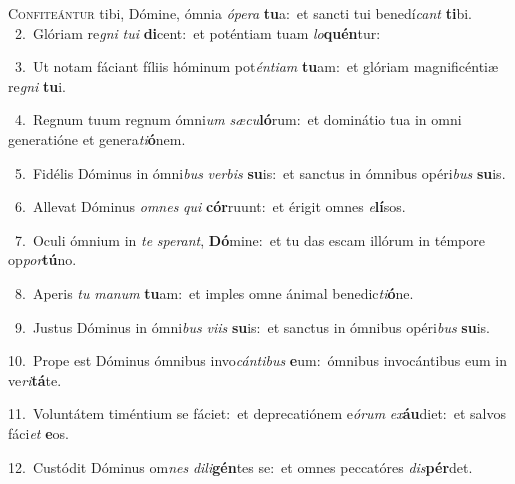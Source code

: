 \lettrine{\initial\textcolor{\initialcolor}{C}}{onfiteántur} tibi, Dómine, ómnia \textit{ó}\-\textit{pe}\textit{ra} \textbf{tu}\-a:~\star et sancti tui benedí\textit{cant} \textbf{ti}\-bi.\\
{\numbfont\textcolor{\numbcolor}{~2.}}~Glóriam re\textit{gni} \textit{tu}\-\textit{i} \textbf{di}\-cent:~\star et poténtiam tuam \textit{lo}\-\textbf{quén}tur:\par
{\numbfont\textcolor{\numbcolor}{~3.}}~Ut notam fáciant fíliis hóminum pot\-\textit{én}\-\textit{ti}\textit{am} \textbf{tu}\-am:~\star et glóriam magnificéntiæ re\textit{gni} \textbf{tu}\-i.\par
{\numbfont\textcolor{\numbcolor}{~4.}}~Regnum tuum regnum ómni\textit{um} \textit{sæ}\-\textit{cu}\textbf{ló}rum:~\star et dominátio tua in omni generatióne et genera\-\textit{ti}\-\textbf{ó}nem.\par
{\numbfont\textcolor{\numbcolor}{~5.}}~Fidélis Dóminus in ómni\textit{bus} \textit{ver}\-\textit{bis} \textbf{su}\-is:~\star et sanctus in ómnibus opéri\textit{bus} \textbf{su}\-is.\par
{\numbfont\textcolor{\numbcolor}{~6.}}~Allevat Dóminus \textit{om}\-\textit{nes} \textit{qui} \textbf{cór}\-ruunt:~\star et érigit omnes \textit{e}\-\textbf{lí}sos.\par
{\numbfont\textcolor{\numbcolor}{~7.}}~Oculi ómnium in \textit{te} \textit{spe}\-\textit{rant}, \textbf{Dó}\-mine:~\star et tu das escam illórum in témpore op\-\textit{por}\-\textbf{tú}no.\par
{\numbfont\textcolor{\numbcolor}{~8.}}~Aperis \textit{tu} \textit{ma}\-\textit{num} \textbf{tu}\-am:~\star et imples omne ánimal benedic\-\textit{ti}\-\textbf{ó}ne.\par
{\numbfont\textcolor{\numbcolor}{~9.}}~Justus Dóminus in ómni\textit{bus} \textit{vi}\-\textit{is} \textbf{su}\-is:~\star et sanctus in ómnibus opéri\textit{bus} \textbf{su}\-is.\par
{\numbfont\textcolor{\numbcolor}{10.}}~Prope est Dóminus ómnibus invo\-\textit{cán}\-\textit{ti}\textit{bus} \textbf{e}\-um:~\star ómnibus invocántibus eum in ve\-\textit{ri}\-\textbf{tá}te.\par
{\numbfont\textcolor{\numbcolor}{11.}}~Voluntátem timéntium se fáciet:~\dagger et deprecatiónem e\-\textit{ó}\-\textit{rum} \textit{ex}\-\textbf{áu}diet:~\star et salvos fáci\textit{et} \textbf{e}\-os.\par
{\numbfont\textcolor{\numbcolor}{12.}}~Custódit Dóminus om\textit{nes} \textit{di}\-\textit{li}\textbf{gén}tes se:~\star et omnes peccatóres \textit{dis}\-\textbf{pér}det.\par
